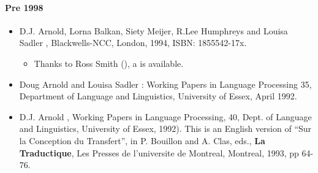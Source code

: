 \documentclass[a4paper]{article}
\begin{document}
\paragraph{Pre 1998}%
\begin{itemize}
\item 
  D.J. Arnold, Lorna Balkan, Siety Meijer, R.Lee Humphreys and Louisa Sadler
  , 
  Blackwells-NCC, London, 1994, ISBN: 1855542-17x.  
     \begin{itemize} 
     \item Thanks to Ross Smith
       (), a
        is available.
     \end{itemize}
%
\item
  Doug Arnold and Louisa Sadler
  :
  Working Papers in Language Processing 35,
  Department of Language and Linguistics, University of Essex,
  April 1992.~
%
\item  D.J. Arnold
     , Working Papers in Language
     Processing, 40, Dept. of Language and Linguistics, University of
     Essex, 1992). This is an English version of 
     ``Sur la Conception du Transfert'', 
     in P. Bouillon and A. Clas, eds.,  {\bf La Traductique}, Les
     Presses de l'universite de Montreal, Montreal, 1993, pp 64-76.~

%  
%
%  
%  
%  

\end{itemize}
\end{document}
